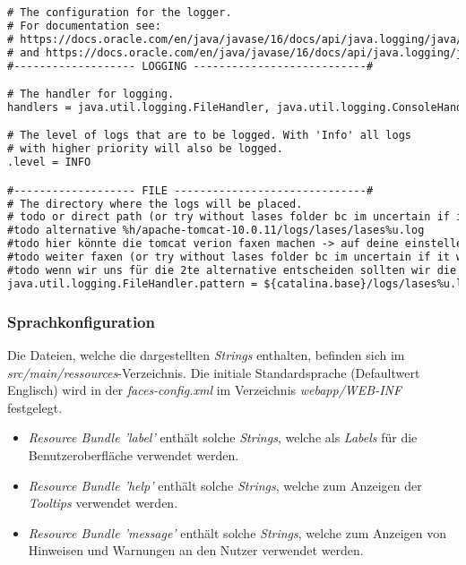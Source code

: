 \begin{lstlisting}[language=XML, caption = Die Loggingkonfiguration \emph{logger.properties}]
# The configuration for the logger.
# For documentation see:
# https://docs.oracle.com/en/java/javase/16/docs/api/java.logging/java/util/logging/FileHandler.html
# and https://docs.oracle.com/en/java/javase/16/docs/api/java.logging/java/util/logging/ConsoleHandler.html
#------------------- LOGGING ---------------------------#

# The handler for logging.
handlers = java.util.logging.FileHandler, java.util.logging.ConsoleHandler

# The level of logs that are to be logged. With 'Info' all logs
# with higher priority will also be logged.
.level = INFO

#------------------- FILE ------------------------------#
# The directory where the logs will be placed.
# todo or direct path (or try without lases folder bc im uncertain if it will be created automatically)
#todo alternative %h/apache-tomcat-10.0.11/logs/lases/lases%u.log
#todo hier könnte die tomcat verion faxen machen -> auf deine einstellen
#todo weiter faxen (or try without lases folder bc im uncertain if it will be created automatically)
#todo wenn wir uns für die 2te alternative entscheiden sollten wir die tomcat version mitm pflichtenheft abchecken
java.util.logging.FileHandler.pattern = ${catalina.base}/logs/lases%u.log
\end{lstlisting}

\subsubsection{Sprachkonfiguration}
Die Dateien, welche die dargestellten \emph{Strings} enthalten, befinden sich im
\emph{src/main/ressources}-Verzeichnis.
Die initiale Standardsprache (Defaultwert Englisch) wird in der \emph{faces-config.xml} im
Verzeichnis \emph{webapp/WEB-INF} festgelegt.

\begin{itemize}
    \item \emph{Resource Bundle 'label'} enthält solche \emph{Strings}, welche als \emph{Labels} für die Benutzeroberfläche verwendet
    werden.
    \item \emph{Resource Bundle 'help'} enthält solche \emph{Strings}, welche zum Anzeigen der \emph{Tooltips} verwendet
    werden.
    \item \emph{Resource Bundle 'message'} enthält solche \emph{Strings}, welche zum Anzeigen von Hinweisen und Warnungen
    an den Nutzer verwendet werden.
\end{itemize}


